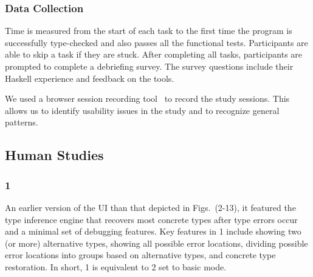 \subsubsection*{\textbf{Data Collection}}
Time is measured from the start of each task to the first time the program is successfully type-checked and also passes all the functional tests. Participants are able to skip a task if they are stuck. 
After completing all tasks, participants are prompted to complete a debriefing survey. The survey questions include their Haskell experience and feedback on the tools.

We used a browser session recording tool~\cite{OpenReplay2022-nw} to record the study sessions. This allows us to identify usability issues in the study and to recognize general patterns. 

\subsection{\chameleon{} Human Studies}

\subsubsection{\textbf{\chameleon{} 1}}  
An earlier version of the UI than that depicted in Figs.~(2-13), it featured the type inference engine that recovers most concrete types after type errors occur and a minimal set of debugging features. Key features in \chameleon{} 1 include showing two (or more) alternative types, showing all possible error locations, dividing possible error locations into groups based on alternative types, and concrete type restoration. In short, \chameleon{} 1 is equivalent to \chameleon{} 2 set to basic mode. 

